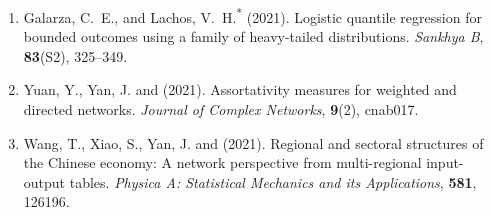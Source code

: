 \begin{enumerate}[resume=journalpubs]

\item\begin{pubentry} Galarza, C.\ E., \PZnot{} and Lachos, V.\ H.\textsuperscript{*} (2021). Logistic quantile regression for bounded outcomes using a family of heavy-tailed distributions. \emph{Sankhya B}, \textbf{83}(S2), 325--349.

\par\end{pubentry}
\item\begin{pubentry} Yuan, Y., Yan, J. and \PZ{} (2021). Assortativity measures for weighted and directed networks. \emph{Journal of Complex Networks}, \textbf{9}(2), cnab017.

\par\end{pubentry}
\item\begin{pubentry} Wang, T., Xiao, S., Yan, J. and \PZ{} (2021). Regional and sectoral structures of the Chinese economy: A network perspective from multi-regional input-output tables. \emph{Physica A: Statistical Mechanics and its Applications}, \textbf{581}, 126196.
\par\end{pubentry}
\end{enumerate}
